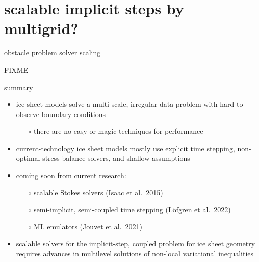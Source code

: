 \documentclass[svgnames,
               hyperref={colorlinks,citecolor=DeepPink4,linkcolor=FireBrick,urlcolor=Maroon},
               usepdftitle=false]  %
               {beamer}
\begin{document}
\section{scalable implicit steps by multigrid?}

\begin{frame}{obstacle problem solver scaling}

FIXME
\end{frame}


\begin{frame}{\alert{summary}}

\begin{itemize}
\item ice sheet models solve a multi-scale, irregular-data problem with hard-to-observe boundary conditions
   \begin{itemize}
   \item[$\circ$] there are \alert{no easy or magic techniques} for performance
   \end{itemize}
\item<2-> current-technology ice sheet models mostly use \alert{explicit} time stepping, \alert{non-optimal} stress-balance solvers, and \alert{shallow} assumptions
\item<3-> \alert{coming soon} from current research:
   \begin{itemize}
   \item[$\circ$] scalable Stokes solvers (Isaac et al.~2015)
   \item[$\circ$] semi-implicit, semi-coupled time stepping (L{\"o}fgren et al.~2022)
   \item[$\circ$] ML emulators (Jouvet et al.~2021)
   \end{itemize}
\item<4-> scalable solvers for the implicit-step, coupled problem for ice sheet geometry requires advances in \alert{multilevel solutions of non-local variational inequalities}
\end{itemize}
\end{frame}
\end{document}

